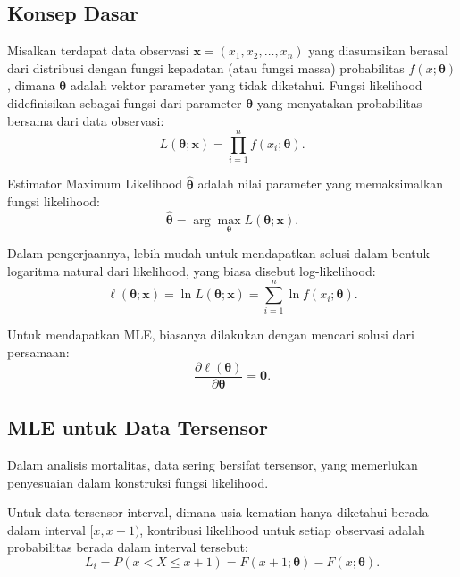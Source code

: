 \subsection{Konsep Dasar}

Misalkan terdapat data observasi $\mathbf{x} = (x_1, x_2, \ldots, x_n)$ yang diasumsikan berasal dari distribusi dengan fungsi kepadatan (atau fungsi massa) probabilitas $f(x; \boldsymbol{\theta})$, dimana $\boldsymbol{\theta}$ adalah vektor parameter yang tidak diketahui. Fungsi likelihood didefinisikan sebagai fungsi dari parameter $\boldsymbol{\theta}$ yang menyatakan probabilitas bersama dari data observasi:
\begin{equation}
L(\boldsymbol{\theta}; \mathbf{x}) = \prod_{i=1}^{n} f(x_i; \boldsymbol{\theta}).
\label{eq:likelihood_definition}
\end{equation}

Estimator Maximum Likelihood $\hat{\boldsymbol{\theta}}$ adalah nilai parameter yang memaksimalkan fungsi likelihood:
\begin{equation}
\hat{\boldsymbol{\theta}} = \arg\max_{\boldsymbol{\theta}} L(\boldsymbol{\theta}; \mathbf{x}).
\label{eq:mle_definition}
\end{equation}

Dalam pengerjaannya, lebih mudah untuk mendapatkan solusi dalam bentuk logaritma natural dari likelihood, yang biasa disebut log-likelihood:
\begin{equation}
\ell(\boldsymbol{\theta}; \mathbf{x}) = \ln L(\boldsymbol{\theta}; \mathbf{x}) = \sum_{i=1}^{n} \ln f(x_i; \boldsymbol{\theta}).
\label{eq:loglikelihood_definition}
\end{equation}

Untuk mendapatkan MLE, biasanya dilakukan dengan mencari solusi dari persamaan:
\begin{equation}
\frac{\partial \ell(\boldsymbol{\theta})}{\partial \boldsymbol{\theta}} = \mathbf{0}.
\label{eq:score_equation}
\end{equation}

\subsection{MLE untuk Data Tersensor}

Dalam analisis mortalitas, data sering bersifat tersensor, yang memerlukan penyesuaian dalam konstruksi fungsi likelihood.

Untuk data tersensor interval, dimana usia kematian hanya diketahui berada dalam interval $[x, x+1)$, kontribusi likelihood untuk setiap observasi adalah probabilitas berada dalam interval tersebut:
\begin{equation}
L_i = P(x < X \leq x+1) = F(x+1; \boldsymbol{\theta}) - F(x; \boldsymbol{\theta}).
\label{eq:likelihood_interval}
\end{equation}

